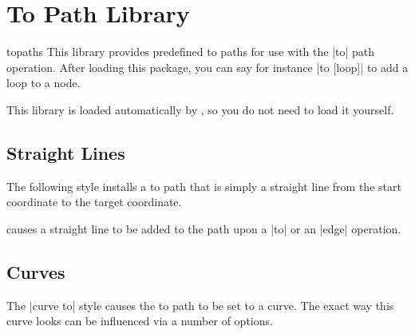 %




\section{To Path Library}

\label{library-to-paths}

\begin{tikzlibrary}{topaths}
  This library provides predefined to paths for use with the |to|
  path operation. After loading this package, you can say for instance
  |to [loop]| to add a loop to a node.

  This library is loaded automatically by \tikzname, so you do not
  need to load it yourself.
\end{tikzlibrary}


\subsection{Straight Lines}

The following style installs a to path that is simply a straight line
from the start coordinate to the target coordinate.

\begin{itemize}
  causes a straight line to be added to the path upon a |to| or an
  |edge| operation.
\begin{codeexample}[]
\end{codeexample}
\end{itemize}


\subsection{Curves}

The |curve to| style causes the to path to be set to a curve. The
exact way this curve looks can be influenced via a number of options.

